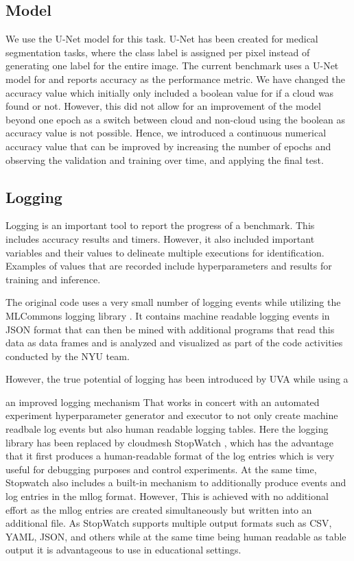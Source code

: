 \documentclass[sigplan,screen]{acmart}
\begin{document}
\subsection{Model}

We use the U-Net \cite{Ronneberger2015UNetCN} model for this task. U-Net has been created for medical segmentation tasks, where the class label is assigned per pixel instead of generating one label for the entire image.
The current benchmark uses a U-Net \cite{???} model for and reports accuracy as the performance metric. We have changed the accuracy value which initially only included a boolean value for if a cloud was found or not. However, this did not allow for an improvement of the model beyond one epoch as a switch between cloud and non-cloud using the boolean as accuracy value is not possible. Hence, we introduced a continuous numerical accuracy value that can be improved by increasing the number of epochs and observing the validation and training over time, and applying the final test.



\subsection{Logging}

Logging is an important tool to report the progress of a benchmark. This includes accuracy results and timers. However, it also included important variables and their values to delineate multiple executions for identification. Examples of values that are recorded include hyperparameters and results for training and inference. 

The original code uses a very small number of logging events while utilizing the MLCommons logging library
\cite{github-mlcommons-logging}. It contains machine readable logging events in JSON format that can then be mined with additional programs that read this data as data frames and is analyzed and visualized as part of the code activities conducted by the NYU team.

However, the true potential of logging has been introduced by UVA while using a 

an improved logging mechanism That works in concert with an automated experiment hyperparameter generator and executor to not only create machine readbale log events but also human readable logging tables.
Here the logging library has been replaced by cloudmesh StopWatch \cite{github-mlcommons-logging,github-cloudmesh-sbatch}, which has the advantage that it first produces a human-readable format of the log entries which is very useful for debugging purposes and control experiments. At the same time, Stopwatch also includes a built-in mechanism to additionally produce events and log entries in the mllog format. However, This is achieved with no additional effort as the mllog entries are created simultaneously but written into an additional file. As StopWatch supports multiple output formats such as CSV, YAML, JSON, and others while at the same time being human readable as table output it is advantageous to use in educational settings.
\end{document}

